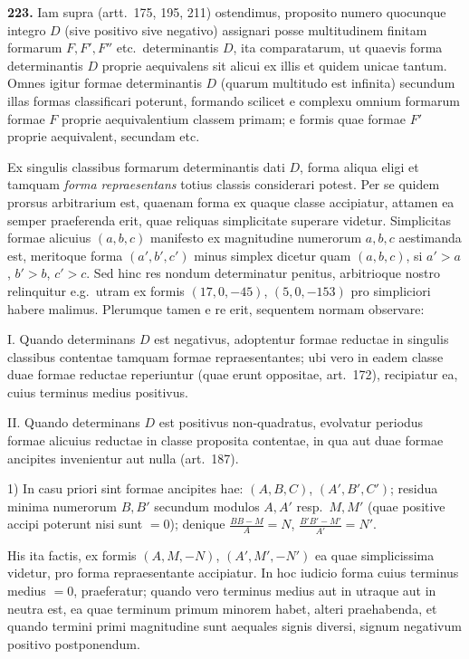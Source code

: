 \documentclass[12pt,a4paper]{article}
\theoremstyle{plain}
\theoremstyle{definition}
\theoremstyle{remark}
\begin{document}
\textbf{223.}
Iam supra (artt.~175, 195, 211) ostendimus, proposito numero quocunque integro $D$ (sive positivo sive negativo) assignari posse multitudinem finitam formarum $F,F',F''$ etc.\ determinantis $D$, ita comparatarum, ut quaevis forma determinantis $D$ proprie aequivalens sit alicui ex illis et quidem unicae tantum. Omnes igitur formae determinantis $D$ (quarum multitudo est infinita) secundum illas formas classificari poterunt, formando scilicet e complexu omnium formarum formae $F$ proprie aequivalentium classem primam; e formis quae formae $F'$ proprie aequivalent, secundam etc.

Ex singulis classibus formarum determinantis dati $D$, forma aliqua eligi et tamquam \emph{forma repraesentans} totius classis considerari potest. Per se quidem prorsus arbitrarium est, quaenam forma ex quaque classe accipiatur, attamen ea semper praeferenda erit, quae reliquas simplicitate superare videtur. Simplicitas formae alicuius $(a,b,c)$ manifesto ex magnitudine numerorum $a,b,c$ aestimanda est, meritoque forma $(a',b',c')$ minus simplex dicetur quam $(a,b,c)$, si $a'>a$, $b'>b$, $c'>c$. Sed hinc res nondum determinatur penitus, arbitrioque nostro relinquitur e.g.\ utram ex formis $(17,0,-45)$, $(5,0,-153)$ pro simpliciori habere malimus. Plerumque tamen e re erit, sequentem normam observare:

\textsc{I.} Quando determinans $D$ est negativus, adoptentur formae reductae in singulis classibus contentae tamquam formae repraesentantes; ubi vero in eadem classe duae formae reductae reperiuntur (quae erunt oppositae, art.~172), recipiatur ea, cuius terminus medius positivus.

\textsc{II.} Quando determinans $D$ est positivus non-quadratus, evolvatur periodus formae alicuius reductae in classe proposita contentae, in qua aut duae formae ancipites invenientur aut nulla (art.~187).

1) In casu priori sint formae ancipites hae: $(A,B,C)$, $(A',B',C')$; residua minima numerorum $B,B'$ secundum modulos $A,A'$ resp.\ $M,M'$ (quae positive accipi poterunt nisi sunt $=0$); denique $\frac{BB-M}{A}=N$, $\frac{B'B'-M'}{A'}=N'$.

His ita factis, ex formis $(A,M,-N)$, $(A',M',-N')$ ea quae simplicissima videtur, pro forma repraesentante accipiatur. In hoc iudicio forma cuius terminus medius $=0$, praeferatur; quando vero terminus medius aut in utraque aut in neutra est, ea quae terminum primum minorem habet, alteri praehabenda, et quando termini primi magnitudine sunt aequales signis diversi, signum negativum positivo postponendum.
\end{document}
